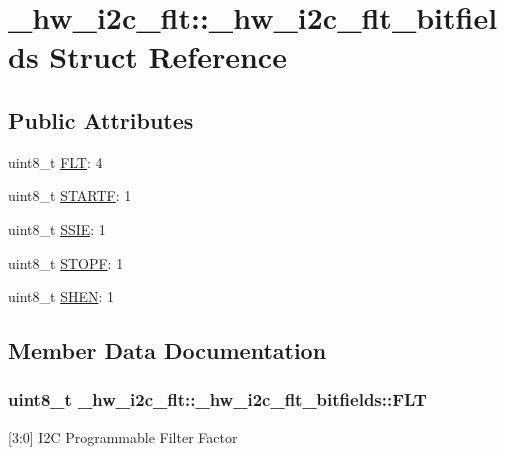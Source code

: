 \hypertarget{struct__hw__i2c__flt_1_1__hw__i2c__flt__bitfields}{}\section{\+\_\+hw\+\_\+i2c\+\_\+flt\+:\+:\+\_\+hw\+\_\+i2c\+\_\+flt\+\_\+bitfields Struct Reference}
\label{struct__hw__i2c__flt_1_1__hw__i2c__flt__bitfields}
\subsection*{Public Attributes}
\begin{DoxyCompactItemize}
\item 
uint8\+\_\+t \hyperlink{struct__hw__i2c__flt_1_1__hw__i2c__flt__bitfields_a5bc12d90c2d231a4b64e5a81be6f76f8}{F\+LT}\+: 4
\item 
uint8\+\_\+t \hyperlink{struct__hw__i2c__flt_1_1__hw__i2c__flt__bitfields_a08f63dd254a73142a0d96ebc41848043}{S\+T\+A\+R\+TF}\+: 1
\item 
uint8\+\_\+t \hyperlink{struct__hw__i2c__flt_1_1__hw__i2c__flt__bitfields_aadb98db2d00e452faf6e04206bf643ee}{S\+S\+IE}\+: 1
\item 
uint8\+\_\+t \hyperlink{struct__hw__i2c__flt_1_1__hw__i2c__flt__bitfields_af4b2625e9e1be78ebd039bc03e316162}{S\+T\+O\+PF}\+: 1
\item 
uint8\+\_\+t \hyperlink{struct__hw__i2c__flt_1_1__hw__i2c__flt__bitfields_a91234524691641d346a41ced0772684c}{S\+H\+EN}\+: 1
\end{DoxyCompactItemize}


\subsection{Member Data Documentation}
\subsubsection[{\texorpdfstring{F\+LT}{FLT}}]{\setlength{\rightskip}{0pt plus 5cm}uint8\+\_\+t \+\_\+hw\+\_\+i2c\+\_\+flt\+::\+\_\+hw\+\_\+i2c\+\_\+flt\+\_\+bitfields\+::\+F\+LT}\hypertarget{struct__hw__i2c__flt_1_1__hw__i2c__flt__bitfields_a5bc12d90c2d231a4b64e5a81be6f76f8}{}\label{struct__hw__i2c__flt_1_1__hw__i2c__flt__bitfields_a5bc12d90c2d231a4b64e5a81be6f76f8}
\mbox{[}3\+:0\mbox{]} I2C Programmable Filter Factor 
